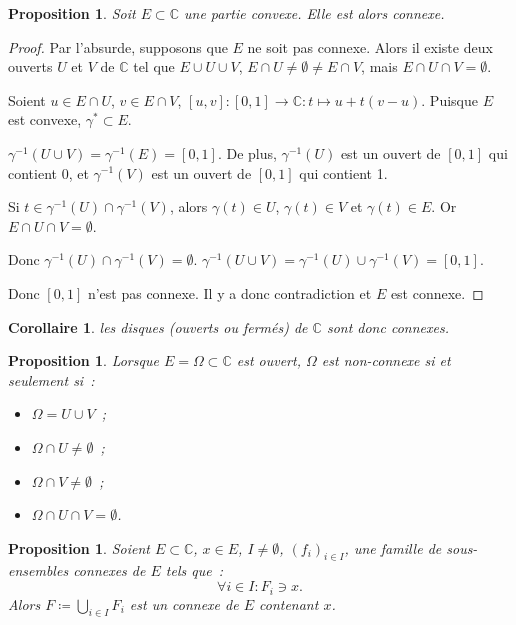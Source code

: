 \documentclass{report}
\newtheorem{prp}[thm]{Proposition}
\newtheorem{cor}[thm]{Corollaire}
\theoremstyle{definition}
\theoremstyle{remark}
\numberwithin{equation}{section}
\newcommand{\C}{\mathbb C}
\begin{document}
			\begin{prp}\label{prp:convexe => connexe} Soit $E \subset \C$ une partie convexe. Elle est alors connexe.
			\end{prp}

			\begin{proof} Par l'absurde, supposons que $E$ ne soit pas connexe. Alors il existe deux ouverts $U$ et $V$ de $\C$ tel que $E \cup U \cup V$,
			$E \cap U \neq \emptyset \neq E \cap V$, mais $E \cap U \cap V = \emptyset$.

			Soient $u \in E \cap U$, $v \in E \cap V$, $[u, v] : [0, 1] \to \C : t \mapsto u + t(v-u)$. Puisque $E$ est convexe, $\gamma^* \subset E$.

			$\gamma^{-1}(U \cup V) = \gamma^{-1}(E) = [0, 1]$. De plus, $\gamma^{-1}(U)$ est un ouvert de $[0, 1]$ qui contient 0, et $\gamma^{-1}(V)$
			est un ouvert de $[0, 1]$ qui contient 1.

			Si $t \in \gamma^{-1}(U) \cap \gamma^{-1}(V)$, alors $\gamma(t) \in U$, $\gamma(t) \in V$ et $\gamma(t) \in E$. Or $E \cap U \cap V = \emptyset$.

			Donc $\gamma^{-1}(U) \cap \gamma^{-1}(V) = \emptyset$. $\gamma^{-1}(U \cup V) = \gamma^{-1}(U) \cup \gamma^{-1}(V) = [0, 1]$.

			Donc $[0, 1]$ n'est pas connexe. Il y a donc contradiction et $E$ est connexe.
			\end{proof}

			\begin{cor} les disques (ouverts ou fermés) de $\C$ sont donc connexes.
			\end{cor}

			\begin{prp} Lorsque $E = \Omega \subset \C$ est ouvert, $\Omega$ est non-connexe si et seulement si~:
			\begin{itemize}
				\item[$(i)$]   $\Omega = U \cup V$~;
				\item[$(ii)$]  $\Omega \cap U \neq \emptyset$~;
				\item[$(iii)$] $\Omega \cap V \neq \emptyset$~;
				\item[$(iv)$]  $\Omega \cap U \cap V = \emptyset$.
			\end{itemize}
			\end{prp}

			\begin{prp} Soient $E \subset \C$, $x \in E$, $I \neq \emptyset$, $(f_i)_{i \in I}$, une famille de sous-ensembles connexes de $E$ tels que~:
			\begin{equation}
				\forall i \in I : F_i \ni x.
			\end{equation}
			Alors $F \coloneqq \bigcup_{i \in I}F_i$ est un connexe de $E$ contenant $x$.
			\end{prp}
\end{document}
